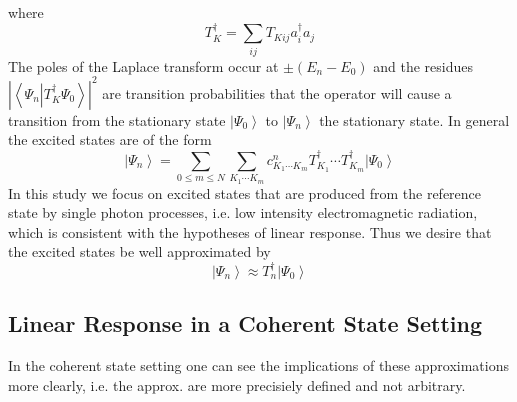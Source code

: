 \documentclass[aps,preprint]{revtex4}%
\begin{document}
where
\begin{equation}
T_{K}^{\dagger}=\sum_{ij}T_{Kij}a_{i}^{\dagger}a_{j}%
\end{equation}
The poles of the Laplace transform occur at $\pm\left(  E_{n}-E_{0}\right)  $
and the residues $\left\vert \left\langle \Psi_{n}\left\vert T_{K}^{\dagger
}\Psi_{0}\right.  \right\rangle \right\vert ^{2}$ are transition probabilities
that the operator will cause a transition from the stationary state
$\left\vert \Psi_{0}\right\rangle $ to $\left\vert \Psi_{n}\right\rangle $ the
stationary state. In general the excited states are of the form%
\begin{equation}
\left\vert \Psi_{n}\right\rangle =\sum_{0\leq m\leq N}\sum_{K_{1}\cdots K_{m}%
}c_{K_{1}\cdots K_{m}}^{n}T_{K_{1}}^{\dagger}\cdots T_{K_{m}}^{\dagger
}\left\vert \Psi_{0}\right\rangle
\end{equation}
In this study we focus on excited states that are produced from the reference
state by single photon processes, i.e. low intensity electromagnetic
radiation, which is consistent with the hypotheses of linear response. Thus we
desire that the excited states be well approximated by%
\begin{equation}
\left\vert \Psi_{n}\right\rangle \approx T_{n}^{\dagger}\left\vert \Psi
_{0}\right\rangle
\end{equation}


\subsection{Linear Response in a Coherent State Setting}

In the coherent state setting one can see the implications of these
approximations more clearly, i.e. the approx. are more precisiely defined and
not arbitrary.
\end{document}
